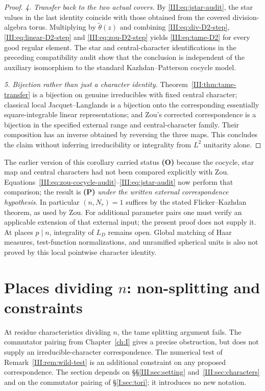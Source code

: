 \begin{proof}
\emph{4. Transfer back to the two actual covers.}
By \eqref{III:eq:jstar-audit}, the star values in the last
identity coincide with those obtained from the covered
division-algebra torus.  Multiplying by
$\widetilde\theta(z)$ and combining
\eqref{III:eq:div-D2-step}, \eqref{III:eq:linear-D2-step}
and \eqref{III:eq:zou-D2-step} yields
\eqref{III:eq:tame-D2} for every good regular element.
The star and central-character identifications in the
preceding compatibility audit show that the conclusion is
independent of the auxiliary isomorphism to the standard
Kazhdan--Patterson cocycle model.

\emph{5. Bijection rather than just a character identity.}
Theorem~\ref{III:thm:tame-transfer} is a bijection on genuine
irreducibles with fixed central character; classical local
Jacquet--Langlands is a bijection onto the corresponding
essentially square-integrable linear representations; and
Zou's corrected correspondence is a bijection in the
specified external range and central-character family.
Their composition has an inverse obtained by reversing the
three maps.  This concludes the claim without inferring
irreducibility or integrality from $L^2$ unitarity alone.
\end{proof}
\begin{remark}
The earlier version of this corollary carried status
\textbf{(O)} because the cocycle, star map and central
characters had not been compared explicitly with Zou.
Equations~\eqref{III:eq:zou-cocycle-audit}--\eqref{III:eq:jstar-audit}
now perform that comparison; the result is \textbf{(P)}
\emph{under the written external correspondence hypothesis}.
In particular $(n,N_r)=1$ suffices by the stated
Flicker--Kazhdan theorem, as used by Zou.  For additional
parameter pairs one must verify an applicable extension of
that external input; the present proof does not supply it.
At places $p\mid n$, integrality of $L_D$ remains open.
Global matching of Haar measures, test-function normalizations,
and unramified spherical units is also not proved by this
local pointwise character identity.
\end{remark}

\section{Places dividing \texorpdfstring{$n$}{n}: non-splitting and constraints}\label{III:sec:wild}
At residue characteristics dividing $n$, the tame splitting
argument fails. The commutator pairing from Chapter~\ref{ch:I} gives a precise
obstruction, but does not supply an irreducible-character
correspondence. The numerical test of Remark~\ref{III:rem:wild-test}
is an additional constraint on any proposed correspondence. The section depends on \S\S\ref{III:sec:setting} and~\ref{III:sec:characters} and on the commutator pairing of \S\ref{I:sec:tori}; it introduces no new notation.

